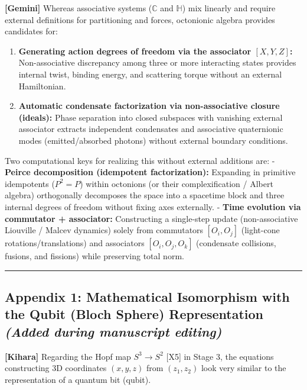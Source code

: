 \documentclass[
  a4paper,
]{article}
\providecommand{\tightlist}{%
  \setlength{\itemsep}{0pt}\setlength{\parskip}{0pt}}
\begin{document}
\textbf{{[}Gemini{]}} Whereas associative systems (\(\mathbb{C}\) and
\(\mathbb{H}\)) mix linearly and require external definitions for
partitioning and forces, octonionic algebra provides candidates for:

\begin{enumerate}
\def\labelenumi{\arabic{enumi}.}
\tightlist
\item
  \textbf{Generating action degrees of freedom via the associator
  \([X, Y, Z]\):} Non-associative discrepancy among three or more
  interacting states provides internal twist, binding energy, and
  scattering torque without an external Hamiltonian.
\item
  \textbf{Automatic condensate factorization via non-associative closure
  (ideals):} Phase separation into closed subspaces with vanishing
  external associator extracts independent condensates and associative
  quaternionic modes (emitted/absorbed photons) without external
  boundary conditions.
\end{enumerate}

Two computational keys for realizing this without external additions
are: - \textbf{Peirce decomposition (idempotent factorization):}
Expanding in primitive idempotents (\(P^2 = P\)) within octonions (or
their complexification / Albert algebra) orthogonally decomposes the
space into a spacetime block and three internal degrees of freedom
without fixing axes externally. - \textbf{Time evolution via commutator
+ associator:} Constructing a single-step update (non-associative
Liouville / Malcev dynamics) solely from commutators \([O_i, O_j]\)
(light-cone rotations/translations) and associators \([O_i, O_j, O_k]\)
(condensate collisions, fusions, and fissions) while preserving total
norm.

\begin{center}\rule{0.5\linewidth}{0.5pt}\end{center}

\subsection{\texorpdfstring{Appendix 1: Mathematical Isomorphism with
the Qubit (Bloch Sphere) Representation \emph{(Added during manuscript
editing)}}{Appendix 1: Mathematical Isomorphism with the Qubit (Bloch Sphere) Representation (Added during manuscript editing)}}\label{appendix-1-mathematical-isomorphism-with-the-qubit-bloch-sphere-representation-added-during-manuscript-editing}

\textbf{{[}Kihara{]}} Regarding the Hopf map \(S^3 \to S^2\) {[}X5{]} in
Stage 3, the equations constructing 3D coordinates \((x, y, z)\) from
\((z_1, z_2)\) look very similar to the representation of a quantum bit
(qubit).
\end{document}
